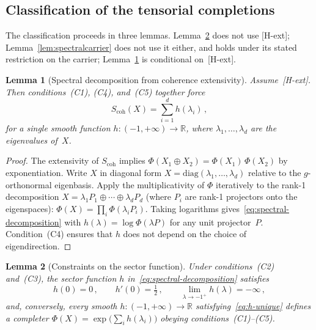 \documentclass[pdflatex,sn-mathphys-num]{sn-jnl} %
\theoremstyle{remark}
\theoremstyle{plain}
\newtheorem{lemma}{Lemma}
\begin{document}
  \subsection{Classification of the tensorial completions}
    \label{subsec:UV-uniqueness}

    The classification proceeds in three lemmas.
    Lemma~\ref{lem:1Dreduction} does not use [H-ext];
    Lemma~\ref{lem:spectralcarrier} does not use it either, and holds under its stated restriction on the
    carrier;
    Lemma~\ref{lem:extensivity-consequence} is conditional
    on~[H-ext].

    \begin{lemma}[Spectral decomposition from coherence
    extensivity]
      \label{lem:extensivity-consequence}
      Assume~\textup{[H-ext]}.
      Then conditions~\textup{(C1)}, \textup{(C4)},
      and~\textup{(C5)} together force
      \begin{equation}\label{eq:spectral-decomposition}
        S_{\mathrm{coh}}(X)
        = \sum_{i=1}^{d} h(\lambda_i)\,,
      \end{equation}
      for a single smooth function
      $h : (-1, +\infty) \to \mathbb{R}$, where
      $\lambda_1, \ldots, \lambda_d$ are the eigenvalues
      of~$X$.
    \end{lemma}

    \begin{proof}
      The extensivity of $S_{\mathrm{coh}}$
      implies $\Phi(X_1 \oplus X_2)
      = \Phi(X_1)\,\Phi(X_2)$ by exponentiation.
      Write $X$ in diagonal form
      $X = \mathrm{diag}(\lambda_1, \ldots, \lambda_d)$
      relative to the $g$-orthonormal eigenbasis.
      Apply the multiplicativity of $\Phi$ iteratively to
      the rank-1 decomposition
      $X = \lambda_1 P_1 \oplus \cdots \oplus \lambda_d P_d$
      (where $P_i$ are rank-1 projectors onto the
      eigenspaces):
      $\Phi(X) = \prod_{i} \Phi(\lambda_i P_i)$.
      Taking logarithms
      gives~\eqref{eq:spectral-decomposition}
      with $h(\lambda) = \log \Phi(\lambda P)$ for any unit
      projector~$P$.
      Condition~(C4) ensures that $h$ does not depend on the
      choice of eigendirection.
    \end{proof}

    \begin{lemma}[Constraints on the sector function]
      \label{lem:1Dreduction}
      Under conditions~\textup{(C2)} and~\textup{(C3)},
      the sector function $h$
      in~\eqref{eq:spectral-decomposition} satisfies
      \begin{equation}\label{eq:h-unique}
        h(0) = 0\,,
        \qquad
        h'(0) = \tfrac{1}{2}\,,
        \qquad
        \lim_{\lambda \to -1^{+}} h(\lambda) = -\infty\,,
      \end{equation}
      and, conversely, every smooth
      $h : (-1, +\infty) \to \mathbb{R}$
      satisfying~\eqref{eq:h-unique} defines a completer
      $\Phi(X) = \exp\bigl(\sum_i h(\lambda_i)\bigr)$
      obeying conditions~\textup{(C1)--(C5)}.
    \end{lemma}
\end{document}
